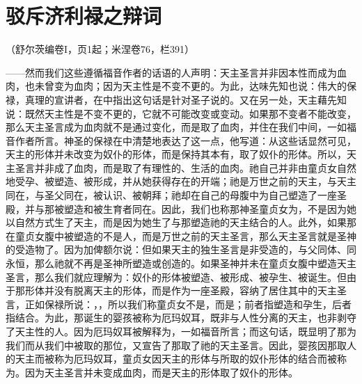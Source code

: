 
\chapter{驳斥济利禄之辩词}


（舒尔茨编卷I，页1起；米涅卷76，栏391）\par

——然而我们这些遵循福音作者的话语的人声明：天主圣言并非因本性而成为血肉，也未曾变为血肉；因为天主性是不变不更的。为此，达味先知也说：伟大的保禄，真理的宣讲者，在中指出这句话是针对圣子说的。又在另一处，天主藉先知说：既然天主性是不变不更的，它就不可能改变或变动。如果那不变者不能改变，那么天主圣言成为血肉就不是通过变化，而是取了血肉，并住在我们中间，一如福音作者所言。神圣的保禄在中清楚地表达了这一点，他写道：从这些话显然可见，天主的形体并未改变为奴仆的形体，而是保持其本有，取了奴仆的形体。所以，天主圣言并非成了血肉，而是取了有理性的、生活的血肉。祂自己并非由童贞女自然地受孕、被塑造、被形成，并从她获得存在的开端；祂是万世之前的天主，与天主同在，与圣父同在，被认识、被朝拜；祂却在自己的母腹中为自己塑造了一座圣殿，并与那被塑造和被生育者同在。因此，我们也称那神圣童贞女为，不是因为她以自然方式生了天主，而是因为她生了与那塑造祂的天主结合的人。此外，如果那在童贞女腹中被塑造的不是人，而是万世之前的天主圣言，那么天主圣言就是圣神的受造物了。因为加俾额尔说：但如果天主的独生圣言是非受造的，与父同体、同永恒，那么祂就不再是圣神所塑造或创造的。如果圣神并未在童贞女腹中塑造天主圣言，那么我们就应理解为：奴仆的形体被塑造、被形成、被孕生、被诞生。但由于那形体并没有脱离天主的形体，而是作为一座圣殿，容纳了居住其中的天主圣言，正如保禄所说：，，所以我们称童贞女不是，而是；前者指塑造和孕生，后者指结合。为此，那诞生的婴孩被称为厄玛奴耳，既非与人性分离的天主，也非剥夺了天主性的人。因为厄玛奴耳被解释为，一如福音所言；而这句话，既显明了那为我们而从我们中被取的那位，又宣告了那取了祂的天主圣言。因此，婴孩因那取人的天主而被称为厄玛奴耳，童贞女因天主的形体与所取的奴仆形体的结合而被称为。因为天主圣言并未变成血肉，而是天主的形体取了奴仆的形体。\par

